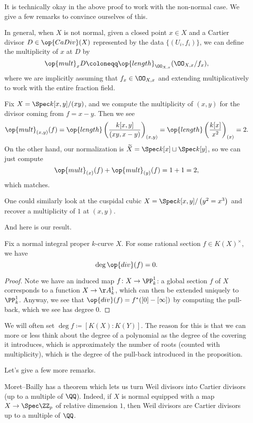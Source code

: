 \documentclass[../notes.tex]{subfiles}
\begin{document}
It is technically okay in the above proof to work with the non-normal case. We give a few remarks to convince ourselves of this.
\begin{remark}
	In general, when $X$ is not normal, given a closed point $x\in X$ and a Cartier divisor $D\in\op{CaDiv}(X)$ represented by the data $\{(U_i,f_i)\}$, we can define the multiplicity of $x$ at $D$ by
	\[\op{mult}_xD\coloneqq\op{length}_{\OO_{X,x}}(\OO_{X,x}/f_x),\]
	where we are implicitly assuming that $f_x\in\OO_{X,x}$ and extending multiplicatively to work with the entire fraction field.
\end{remark}
\begin{example}
	Fix $X=\Spec k[x,y]/(xy)$, and we compute the multiplicity of $(x,y)$ for the divisor coming from $f=x-y$. Then we see
	\[\op{mult}_{(x,y)}(f)=\op{length}\left(\frac{k[x,y]}{(xy,x-y)}\right)_{(x,y)}=\op{length}\left(\frac{k[x]}{x^2}\right)_{(x)}=2.\]
	On the other hand, our normalization is $\widetilde X=\Spec k[x]\sqcup\Spec k[y]$, so we can just compute
	\[\op{mult}_{(x)}(f)+\op{mult}_{(y)}(f)=1+1=2,\]
	which matches.
\end{example}
\begin{example}
	One could similarly look at the cuspidal cubic $X=\Spec k[x,y]/\left(y^2=x^3\right)$ and recover a multiplicity of $1$ at $(x,y)$.
\end{example}
And here is our result.
\begin{corollary}
	Fix a normal integral proper $k$-curve $X$. For some rational section $f\in K(X)^\times$, we have
	\[\deg\op{div}(f)=0.\]
\end{corollary}
\begin{proof}
	Note we have an induced map $f\colon X\to\PP^1_k$: a global section $f$ of $X$ corresponds to a function $X\to\AA^1_k$, which can then be extended uniquely to $\PP^1_k$. Anyway, we see that $\op{div}(f)=f^*([0]-[\infty])$ by computing the pull-back, which we see has degree $0$.
\end{proof}
\begin{remark}
	We will often set $\deg f\coloneqq[K(X):K(Y)]$. The reason for this is that we can more or less think about the degree of a polynomial as the degree of the covering it introduces, which is approximately the number of roots (counted with multiplicity), which is the degree of the pull-back introduced in the proposition.
\end{remark}
Let's give a few more remarks.
\begin{remark}
	Moret--Bailly has a theorem which lets us turn Weil divisors into Cartier divisors (up to a multiple of $\QQ$). Indeed, if $X$ is normal equipped with a map $X\to\Spec\ZZ_p$ of relative dimension $1$, then Weil divisors are Cartier divisors up to a multiple of $\QQ$.
\end{remark}
\end{document}
